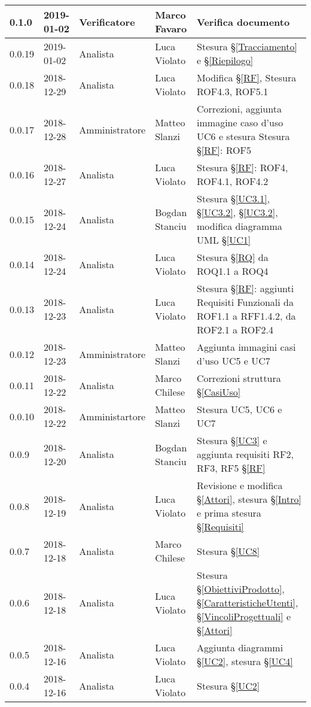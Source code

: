 \begin{center}
\begin{longtable}[C]{|m{}|m{}|m{}|m{}|p{}|}
\hline
 0.1.0 & 2019-01-02 & Verificatore & Marco Favaro & Verifica documento\\
\hline
\rowcolor{grigio}0.0.19 & 2019-01-02 & Analista & Luca Violato & Stesura §\ref{Tracciamento} e §\ref{Riepilogo}\\
\hline
0.0.18 & 2018-12-29 & Analista & Luca Violato & Modifica §\ref{RF}, Stesura ROF4.3, ROF5.1\\
\hline
\rowcolor{grigio}0.0.17 & 2018-12-28 & Amministratore & Matteo Slanzi & Correzioni, aggiunta immagine caso d'uso UC6 e stesura Stesura §\ref{RF}: ROF5\\
\hline
0.0.16 & 2018-12-27 & Analista & Luca Violato & Stesura §\ref{RF}: ROF4, ROF4.1, ROF4.2\\
\hline
\rowcolor{grigio}0.0.15 & 2018-12-24 & Analista & Bogdan Stanciu & Stesura §\ref{UC3.1}, §\ref{UC3.2}, §\ref{UC3.2}, modifica diagramma UML §\ref{UC1} \\
\hline
0.0.14 & 2018-12-24 & Analista & Luca Violato & Stesura §\ref{RQ} da ROQ1.1 a ROQ4\\
\hline
\rowcolor{grigio}0.0.13 & 2018-12-23 & Analista & Luca Violato & Stesura §\ref{RF}: aggiunti Requisiti Funzionali da ROF1.1 a RFF1.4.2, da ROF2.1 a ROF2.4\\
\hline
0.0.12 & 2018-12-23 & Amministratore & Matteo Slanzi & Aggiunta immagini casi d'uso UC5 e UC7\\
\hline
\rowcolor{grigio}0.0.11 & 2018-12-22 & Analista & Marco Chilese & Correzioni struttura §\ref{CasiUso}\\
\hline
0.0.10 & 2018-12-22 & Amministartore & Matteo Slanzi & Stesura UC5, UC6 e UC7   \\
\hline
\rowcolor{grigio}0.0.9 & 2018-12-20 & Analista & Bogdan Stanciu & Stesura §\ref{UC3} e aggiunta requisiti RF2, RF3, RF5 §\ref{RF} \\
\hline
0.0.8 & 2018-12-19 & Analista & Luca Violato & Revisione e modifica §\ref{Attori}, stesura §\ref{Intro} e prima stesura §\ref{Requisiti} \\
\hline
\rowcolor{grigio}0.0.7 & 2018-12-18 & Analista & Marco Chilese & Stesura §\ref{UC8}\\
\hline
0.0.6 & 2018-12-18 & Analista & Luca Violato & Stesura §\ref{ObiettiviProdotto}, §\ref{CaratteristicheUtenti}, §\ref{VincoliProgettuali} e §\ref{Attori}\\
\hline
\rowcolor{grigio}0.0.5 & 2018-12-16 & Analista & Luca Violato & Aggiunta diagrammi §\ref{UC2}, stesura §\ref{UC4}\\
\hline
0.0.4 & 2018-12-16 & Analista & Luca Violato & Stesura §\ref{UC2}\\

\end{longtable}
\end{center}
